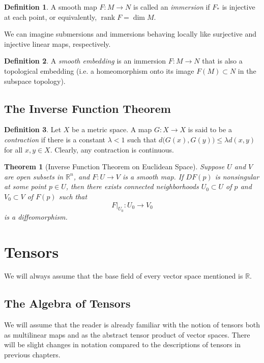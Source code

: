 \documentclass{article}
\DeclareMathOperator{\rank}{rank}
\newtheorem{theorem}{Theorem}[section]
\theoremstyle{remark}
\theoremstyle{definition}
\newtheorem{definition}{Definition}[section]
\begin{document}
\begin{definition}
A smooth map $F: M \longrightarrow N$ is called an \textit{immersion} if $F_*$ is injective at each point, or equivalently, $\rank{F} = \dim{M}$. 
\end{definition}

We can imagine submersions and immersions behaving locally like surjective and injective linear maps, respectively. 

\begin{definition}
A \textit{smooth embedding} is an immersion $F: M \longrightarrow N$ that is also a topological embedding (i.e. a homeomorphism onto its image $F(M) \subset N$ in the subspace topology). 
\end{definition}

\subsection{The Inverse Function Theorem}

\begin{definition}
Let $X$ be a metric space. A map $G: X \longrightarrow X$ is said to be a \textit{contraction} if there is a constant $\lambda < 1$ such that $d\big( G(x), G(y) \big) \leq \lambda d(x, y)$ for all $x, y \in X$. Clearly, any contraction is continuous. 
\end{definition}

\begin{theorem}[Inverse Function Theorem on Euclidean Space]
Suppose $U$ and $V$ are open subsets in $\mathbb{R}^n$, and $F: U \longrightarrow V$ is a smooth map. If $DF(p)$ is nonsingular at some point $p \in U$, then there exists connected neighborhoods $U_0 \subset U$ of $p$ and $V_0 \subset V$ of $F(p)$ such that 
\[F \big|_{U_0} : U_0 \longrightarrow V_0\]
is a diffeomorphism. 
\end{theorem}

\section{Tensors}
We will always assume that the base field of every vector space mentioned is $\mathbb{R}$. 

\subsection{The Algebra of Tensors}
We will assume that the reader is already familiar with the notion of tensors both as multilinear maps and as the abstract tensor product of vector spaces. There will be slight changes in notation compared to the descriptions of tensors in previous chapters. 
\end{document}
